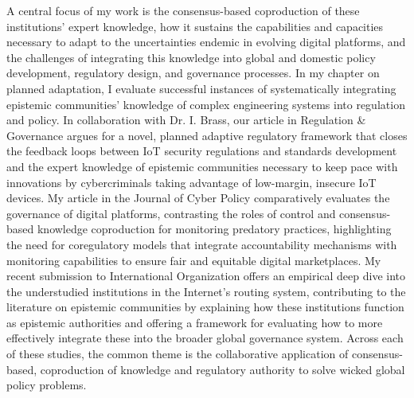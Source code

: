 \documentclass[11pt]{letter}
\begin{document}
\begin{letter}
%
A central focus of my work is the consensus-based coproduction of these institutions' expert knowledge, how it sustains the capabilities and capacities necessary to adapt to the uncertainties endemic in evolving digital platforms, and the challenges of integrating this knowledge into global and
domestic policy development, regulatory design, and governance processes. 
%
In my chapter on planned adaptation, I evaluate successful instances of systematically integrating epistemic communities' knowledge of complex engineering systems into regulation and policy.
%
In collaboration with Dr. I. Brass, our article in Regulation \& Governance
argues for a novel, planned adaptive regulatory framework that closes the feedback loops between IoT security regulations and standards development and the expert knowledge of epistemic communities necessary to keep pace with innovations by cybercriminals taking advantage of low-margin,
insecure IoT devices.
%
My article in the Journal of Cyber Policy comparatively evaluates the governance of digital platforms, contrasting the roles of control and consensus-based knowledge coproduction for monitoring predatory practices, highlighting the need for coregulatory models that integrate accountability mechanisms with monitoring capabilities to ensure fair and equitable digital marketplaces.
%
My recent submission to International Organization offers an empirical deep dive into the understudied institutions in the Internet's routing system, contributing to the literature on epistemic communities by explaining how these institutions function as epistemic authorities and offering a framework for evaluating how to more effectively integrate these into the broader global governance system.
%
Across each of these studies, the common theme is the collaborative application of consensus-based, coproduction of knowledge and regulatory authority to solve wicked global policy problems.


\end{letter}
\end{document}

